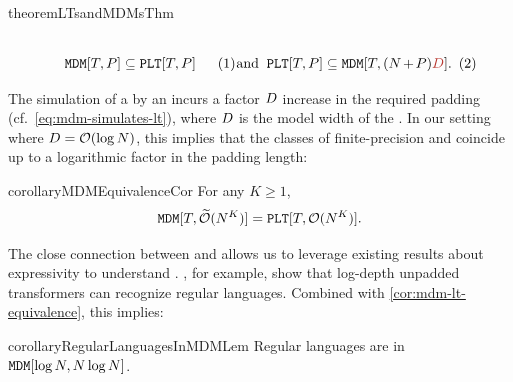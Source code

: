 \documentclass{article} %
\begin{document}
\begin{restatable}{theorem}{LTsandMDMsThm} \label{thm:lts-mdms} \hfill
   
   \begin{subequations}      
      \noindent\begin{minipage}[b]{0.4\textwidth}
         \begin{equation}
            \MDMClassEdit[\timesteps, \padlen] \subseteq \LTClass[\timesteps, \padlen]
         \end{equation}
      \end{minipage}
      \hfill
      \begin{minipage}[b]{0.05\textwidth}
         \centering
         and
      \end{minipage}
      \hfill
      \begin{minipage}[b]{0.45\textwidth}
         \begin{equation} \label{eq:mdm-simulates-lt}
            \LTClass[\timesteps, \padlen] \subseteq \MDMClassEdit[\timesteps, (\strlen + \padlen) \textcolor{ETHRed}{\hiddDim}].
         \end{equation}
      \end{minipage}
   \end{subequations}
\end{restatable}
The simulation of a \LTAcr by an \MDMAcr incurs a factor ${{D}}$ increase in the required padding (cf.~\cref{eq:mdm-simulates-lt}), where ${{D}}$ is the model width of the \LTAcr.
In our setting where ${{D}} = {{{{\mathcal{O}}}(\log {{N}})}}$, this implies that the classes of finite-precision \MDMsAcr and \LTsAcr coincide up to a logarithmic factor in the padding length:
\begin{restatable}{corollary}{MDMEquivalenceCor} \label{cor:mdm-lt-equivalence}
   For any $K \geq 1$,
   \begin{equation}
      {\mathtt{MDM}}[{T}, {{{{\widetilde{{{\mathcal{O}}}}}}({{N}}^K)}}] = {\mathtt{PLT}}[{T}, {{{{\mathcal{O}}}({{N}}^K)}}].
   \end{equation}
\end{restatable}

The close connection between \MDMsAcr and \LTsAcr allows us to leverage existing results about \LTAcr expressivity to understand \MDMsAcr.
\citet[][Thm. 5.1]{saunshi2025reasoninglatentthoughtspower}, for example, show that log-depth unpadded transformers can recognize regular languages.
Combined with \cref{cor:mdm-lt-equivalence}, this implies:
\begin{restatable}{corollary}{RegularLanguagesInMDMLem} \label{cor:mdms-can-simulate-regular-languages}
   Regular languages are in ${\mathtt{MDM}}[\log{{N}}, {{N}} \log{{N}}]$.
\end{restatable}
\end{document}
